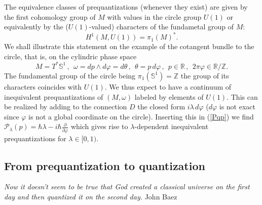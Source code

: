 The equivalence classes of prequantizations (whenever they exist) are given by the first cohomology group
of $M$ with values in the circle group $U(1)$ or equivalently by the ($U(1)$-valued) characters of the
fundametal group of $M$:
\begin{equation}
\label{H1U1}
H^1(M, U(1)) = \pi_1(M)^*.
\end{equation}
We shall illustrate this statement on the example of the cotangent bundle to 
the circle, that is, on the cylindric phase space
\begin{equation}
\label{cyl}
M = T^*{\mathbb S}^1\,,\ \ \omega = dp\wedge d\varphi = d \theta\,, \ \
\theta = p\, d\varphi\,,\ \ p \in {\mathbb R}\,, \ \ 2 \pi\varphi \in 
\mathbb{R}/\mathbb{Z}.
\end{equation}
The fundamental group of the circle being $\pi_1({\mathbb S}^1) = \mathbb{Z}$ 
the group of its characters coincides with $U(1)$. We thus expect to have a 
continuum of inequivalent prequantizations of $(M, \omega)$
labeled by elements of $U(1)$. This can be realized by adding to the connection
 $D$ the closed form $i\lambda\,
d\varphi$   ($d\varphi$ is not exact since $\varphi$ is not a global coordinate on the circle). Inserting
this in (\ref{Pqp}) we find ${\mathcal P}_\lambda (p) = \hbar \lambda - i\hbar 
\frac{\partial}{\partial \varphi}$ which  gives rise to $\lambda$-dependent 
inequivalent prequantizations for $\lambda \in [0, 1)$.

\smallskip

\subsection{From prequantization to quantization}

\hfill\begin{minipage}{.7\linewidth}
{\it Now it doesn't seem to be true that God created a classical universe on the first day
and then quantized it on the second day.} 
John Baez \cite{B06}
\end{minipage}

\smallskip

